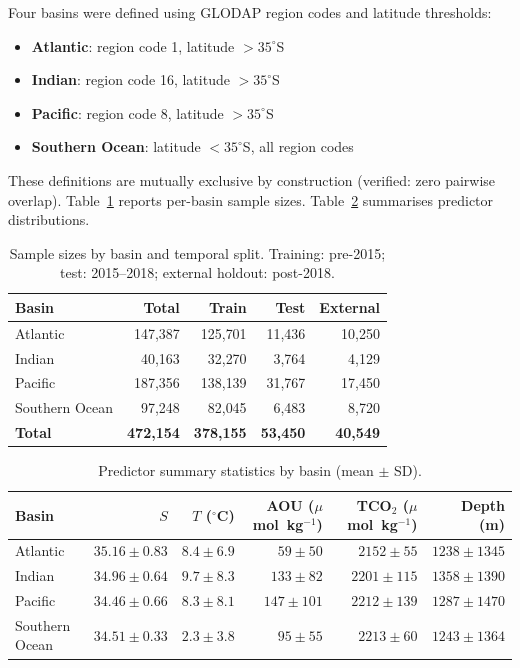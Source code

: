 \documentclass[12pt,a4paper]{article}
\begin{document}
Four basins were defined using GLODAP region codes and latitude thresholds:
\begin{itemize}[nosep]
    \item \textbf{Atlantic}: region code 1, latitude $> 35^\circ$S
    \item \textbf{Indian}: region code 16, latitude $> 35^\circ$S
    \item \textbf{Pacific}: region code 8, latitude $> 35^\circ$S
    \item \textbf{Southern Ocean}: latitude $< 35^\circ$S, all region codes
\end{itemize}
These definitions are mutually exclusive by construction (verified: zero pairwise overlap). Table~\ref{tab:sample_sizes} reports per-basin sample sizes. Table~\ref{tab:predictor_stats} summarises predictor distributions.

\begin{table}[htbp]
\centering
\caption{Sample sizes by basin and temporal split. Training: pre-2015; test: 2015--2018; external holdout: post-2018.}
\label{tab:sample_sizes}
\begin{tabular}{lrrrr}
\toprule
\textbf{Basin} & \textbf{Total} & \textbf{Train} & \textbf{Test} & \textbf{External} \\
\midrule
Atlantic        & 147{,}387 & 125{,}701 & 11{,}436 & 10{,}250 \\
Indian          &  40{,}163 &  32{,}270 &  3{,}764 &  4{,}129 \\
Pacific         & 187{,}356 & 138{,}139 & 31{,}767 & 17{,}450 \\
Southern Ocean  &  97{,}248 &  82{,}045 &  6{,}483 &  8{,}720 \\
\midrule
\textbf{Total}  & \textbf{472{,}154} & \textbf{378{,}155} & \textbf{53{,}450} & \textbf{40{,}549} \\
\bottomrule
\end{tabular}
\end{table}

\begin{table}[htbp]
\centering
\caption{Predictor summary statistics by basin (mean $\pm$ SD).}
\label{tab:predictor_stats}
\begin{tabular}{lrrrrr}
\toprule
\textbf{Basin} & $S$ & $T$ ($^\circ$C) & AOU ($\mu$mol~kg$^{-1}$) & TCO$_2$ ($\mu$mol~kg$^{-1}$) & Depth (m) \\
\midrule
Atlantic       & $35.16 \pm 0.83$ & $8.4 \pm 6.9$  & $59 \pm 50$  & $2152 \pm 55$  & $1238 \pm 1345$ \\
Indian         & $34.96 \pm 0.64$ & $9.7 \pm 8.3$  & $133 \pm 82$ & $2201 \pm 115$ & $1358 \pm 1390$ \\
Pacific        & $34.46 \pm 0.66$ & $8.3 \pm 8.1$  & $147 \pm 101$& $2212 \pm 139$ & $1287 \pm 1470$ \\
Southern Ocean & $34.51 \pm 0.33$ & $2.3 \pm 3.8$  & $95 \pm 55$  & $2213 \pm 60$  & $1243 \pm 1364$ \\
\bottomrule
\end{tabular}
\end{table}
\end{document}
